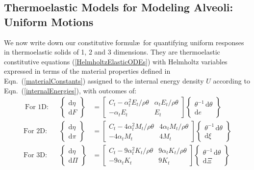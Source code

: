 \subsection{Thermoelastic Models for Modeling Alveoli: Uniform Motions}

We now write down our constitutive formul\ae\ for quantifying uniform responses in thermo\-elastic solids of 1, 2 and 3 dimensions.  They are thermo\-elastic constitutive equations (\ref{HelmholtzElasticODEs}) with Helmholtz variables expressed in terms of the material properties defined in Eqn.~(\ref{materialConstants}) assigned to the internal energy density $U$ according to Eqn.~(\ref{internalEnergies}), with outcomes of:
\begin{subequations}
    \label{HelmholtzCEs}
    \begin{align}\
    \text{For 1D:} & &
    \left\{ \begin{matrix}
    \mathrm{d} \eta \\ \mathrm{d} F
    \end{matrix} \right\} & = \begin{bmatrix}
    C_t - \alpha^2_t E_t / \rho \theta & 
    \alpha_t E_t / \rho \theta \\
    -\alpha_t E_t & E_t
    \end{bmatrix} \left\{ \begin{matrix}
    \theta^{-1} \, \mathrm{d} \theta \\ \mathrm{d} e
    \end{matrix} \right\} \label{Helmholtz1D} \\
    \text{For 2D:} & &
    \left\{ \begin{matrix}
    \mathrm{d} \eta \\ \mathrm{d} \pi
    \end{matrix} \right\} & = \begin{bmatrix}
    C_t - 4 \alpha_t^2 M_t / \rho \theta & 
    4 \alpha_t M_t / \rho \theta \\
    -4 \alpha_t M_t & 4 M_t
    \end{bmatrix} \left\{ \begin{matrix}
    \theta^{-1} \, \mathrm{d} \theta \\ \mathrm{d} \xi
    \end{matrix} \right\} \label{Helmholtz2D} \\
    \text{For 3D:} & &
    \left\{ \begin{matrix}
    \mathrm{d} \eta \\ \mathrm{d} \Pi
    \end{matrix} \right\} & = \begin{bmatrix}
    C_t - 9 \alpha^2_t K_t / \rho \theta & 
    9 \alpha_t K_t / \rho \theta \\
    -9 \alpha_t K_t & 9 K_t
    \end{bmatrix} \left\{ \begin{matrix}
    \theta^{-1} \, \mathrm{d} \theta \\ \mathrm{d} \Xi
    \end{matrix} \right\} \label{Helmholtz3D}
    \end{align}
\end{subequations}
